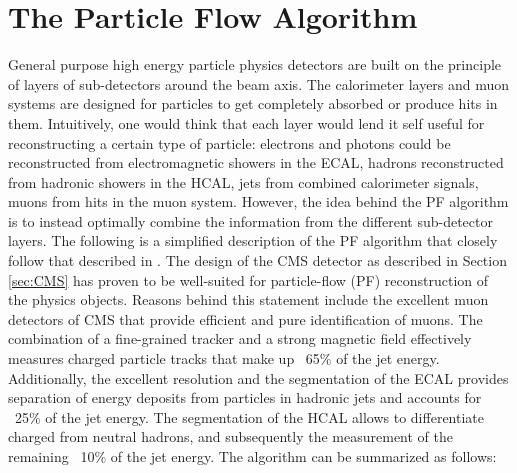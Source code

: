 \section{The Particle Flow Algorithm}\label{sec:PF}
General purpose high energy particle physics detectors are built on the principle of layers of sub-detectors around the beam axis. 
The calorimeter layers and muon systems are designed for particles to get completely absorbed or produce hits in them. 
Intuitively, one would think that each layer would lend it self useful for reconstructing a certain type of particle: electrons and photons could be reconstructed from electromagnetic showers in the ECAL, hadrons reconstructed from hadronic showers in the HCAL, jets from combined calorimeter signals, muons from hits in the muon system. 
However, the idea behind the PF algorithm is to instead optimally combine the information from the different sub-detector layers.   
The following is a simplified description of the PF algorithm that closely follow that described in \cite{Sirunyan:2017ulk}.
The design of the CMS detector as described in Section \ref{sec:CMS} has proven to be well-suited for particle-flow (PF) reconstruction of the physics objects. 
Reasons behind this statement include the excellent muon detectors of CMS that provide efficient and pure identification of muons. 
The combination of a fine-grained tracker and a strong magnetic field effectively measures charged particle tracks that make up ~65\% of the jet energy. 
Additionally, the excellent resolution and the segmentation of the ECAL provides separation of energy deposits from particles in hadronic jets and accounts for ~25\% of the jet energy. 
The segmentation of the HCAL allows to differentiate charged from neutral hadrons, and subsequently the measurement of the remaining ~10\% of the jet energy. 
The algorithm can be summarized as follows:
